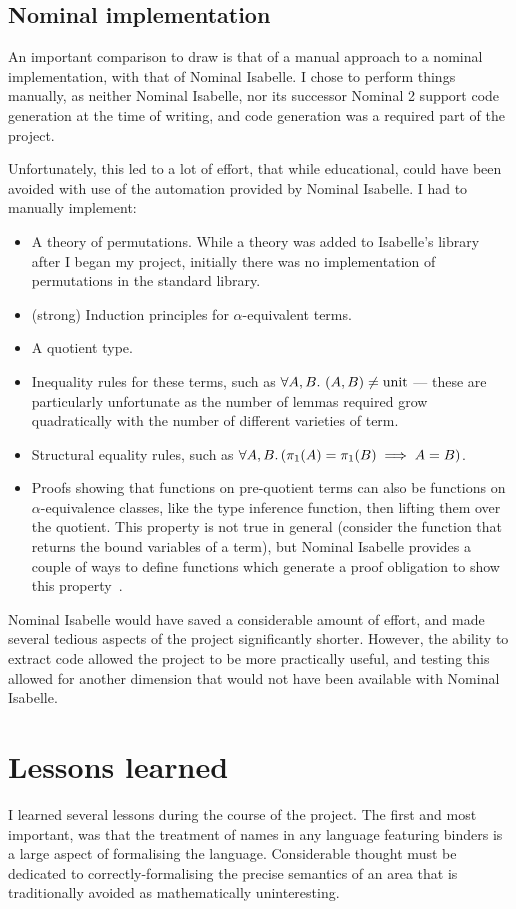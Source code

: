 \subsection{Nominal implementation}
An important comparison to draw is that of a manual approach to a nominal implementation, with that of Nominal Isabelle.
I chose to perform things manually, as neither Nominal Isabelle, nor its successor Nominal 2 support code generation at the time of writing, and code generation was a required part of the project.

Unfortunately, this led to a lot of effort, that while educational, could have been avoided with use of the automation provided by Nominal Isabelle.
I had to manually implement:
\begin{itemize}
\item
A theory of permutations.
While a theory was added to Isabelle's library after I began my project, initially there was no implementation of permutations in the standard library.
\item
(strong) Induction principles for \(\alpha\)-equivalent terms.
\item
A quotient type.
\item
Inequality rules for these terms, such as \(\forall A, B.\ (A, B) \neq \mathrm{unit}\) --- these are particularly unfortunate as the number of lemmas required grow quadratically with the number of different varieties of term.
\item
Structural equality rules, such as \(\forall A, B.\left(\pi_1(A) = \pi_1(B) \implies A = B\right)\).
\item
Proofs showing that functions on pre-quotient terms can also be functions on \(\alpha\)-equivalence classes, like the type inference function, then lifting them over the quotient.
This property is not true in general (consider the function that returns the bound variables of a term), but Nominal Isabelle provides a couple of ways to define functions which generate a proof obligation to show this property~\cite{fresh-fun}.
\end{itemize}

Nominal Isabelle would have saved a considerable amount of effort, and made several tedious aspects of the project significantly shorter.
However, the ability to extract code allowed the project to be more practically useful, and testing this allowed for another dimension that would not have been available with Nominal Isabelle.

\section{Lessons learned}
\label{sec:lessons}
I learned several lessons during the course of the project.
The first and most important, was that the treatment of names in any language featuring binders is a large aspect of formalising the language.
Considerable thought must be dedicated to correctly-formalising the precise semantics of an area that is traditionally avoided as mathematically uninteresting.

